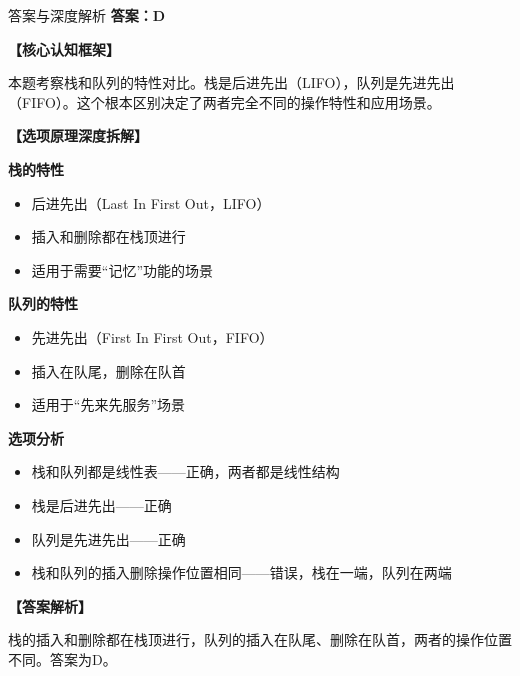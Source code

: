 \documentclass[12pt, a4paper]{article}
\newenvironment{bluebox}{\begin{framed}\begin{minipage}{\linewidth}}{\end{minipage}\end{framed}}
\begin{document}
\begin{bluebox}{答案与深度解析}
	\textbf{答案：D}

	\textbf{【核心认知框架】}

	本题考察栈和队列的特性对比。栈是后进先出（LIFO），队列是先进先出（FIFO）。这个根本区别决定了两者完全不同的操作特性和应用场景。

	\textbf{【选项原理深度拆解】}

	\item \textbf{栈的特性}
	\begin{itemize}
		\item 后进先出（Last In First Out，LIFO）
		\item 插入和删除都在栈顶进行
		\item 适用于需要“记忆”功能的场景
	\end{itemize}

	\item \textbf{队列的特性}
	\begin{itemize}
		\item 先进先出（First In First Out，FIFO）
		\item 插入在队尾，删除在队首
		\item 适用于“先来先服务”场景
	\end{itemize}

	\item \textbf{选项分析}
	\begin{itemize}
		\item[A.] 栈和队列都是线性表——正确，两者都是线性结构
		\item[B.] 栈是后进先出——正确
		\item[C.] 队列是先进先出——正确
		\item[D.] 栈和队列的插入删除操作位置相同——错误，栈在一端，队列在两端
	\end{itemize}

	\textbf{【答案解析】}

	栈的插入和删除都在栈顶进行，队列的插入在队尾、删除在队首，两者的操作位置不同。答案为D。
\end{bluebox}
\end{document}
